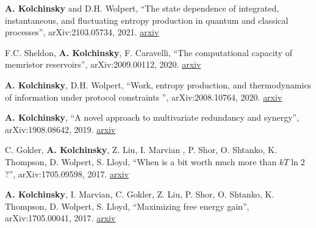
\textbf{A. Kolchinsky} and D.H. Wolpert, ``The state dependence of integrated, instantaneous, and fluctuating entropy production in quantum and classical processes'', arXiv:2103.05734, 2021. \href{http://arxiv.org/abs/2103.05734}{arxiv}


F.C. Sheldon, \textbf{A. Kolchinsky}, F. Caravelli, ``The computational capacity of memristor reservoirs'', arXiv:2009.00112, 2020. \href{http://arxiv.org/abs/2009.00112}{arxiv}


\textbf{A. Kolchinsky}, D.H. Wolpert, ``Work, entropy production, and thermodynamics of information under protocol constraints
'', arXiv:2008.10764, 2020. \href{http://arxiv.org/abs/2008.10764}{arxiv}


\textbf{A. Kolchinsky}, ``A novel approach to multivariate redundancy and synergy'', arXiv:1908.08642, 2019. \href{https://arxiv.org/abs/1908.08642}{arxiv}

C. Gokler, \textbf{A. Kolchinsky}, Z. Liu, I. Marvian , P. Shor, O. Shtanko, K. Thompson, D. Wolpert, S. Lloyd, ``When is a bit worth much more than $kT \ln 2$?'', arXiv:1705.09598, 2017. \href{https://arxiv.org/abs/1705.09598}{arxiv}

\textbf{A. Kolchinsky}, I. Marvian, C. Gokler, Z. Liu, P. Shor, O. Shtanko, K. Thompson, D. Wolpert, S. Lloyd, ``Maximizing free energy gain'', arXiv:1705.00041, 2017. \href{https://arxiv.org/abs/1705.00041}{arxiv}


